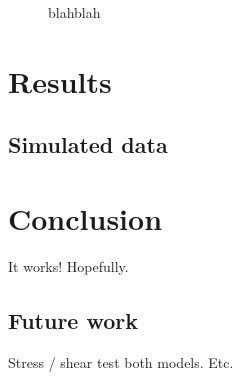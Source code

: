 \documentclass[aps,pre,twocolumn,letterpaper,floatfix,showpacs]{revtex4}
\begin{document}
\begin{figure}
\caption{blahblah}
\label{fig:model12}
\end{figure}



\section{Results}

\subsection{Simulated data}


\section{Conclusion}
It works! Hopefully.
\subsection{Future work}
Stress / shear test both models. Etc.







\end{document}
